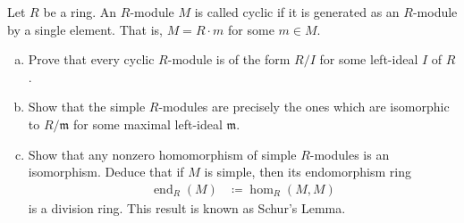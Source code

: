 \documentclass[10pt]{mypackage}
\begin{document}
\begin{problem}[Problem 5]
  Let $R$ be a ring. An $R$-module $M$ is called cyclic if it is generated as an $R$-module by a single element. That is, $M = R\cdot m$ for some $m\in M$.
  \begin{enumerate}[(a)]
    \item Prove that every cyclic $R$-module is of the form $R/I$ for some left-ideal $I$ of $R$.
    \item Show that the simple $R$-modules are precisely the ones which are isomorphic to $R/\mathfrak{m}$ for some maximal left-ideal $\mathfrak{m}$.
    \item Show that any nonzero homomorphism of simple $R$-modules is an isomorphism. Deduce that if $M$ is simple, then its endomorphism ring
      \begin{align*}
        \operatorname{end}_R\left( M \right) &\coloneq \hom_{R}\left( M,M \right)
      \end{align*}
      is a division ring. This result is known as Schur's Lemma.
  \end{enumerate}
\end{problem}
\end{document}
